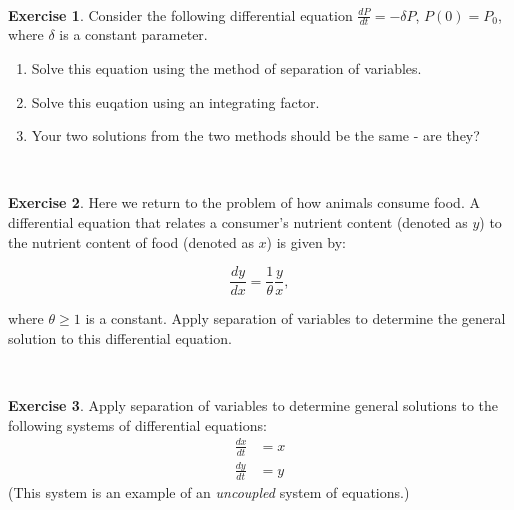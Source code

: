 \documentclass[
]{book}
\theoremstyle{definition}
\theoremstyle{definition}
\theoremstyle{definition}
\newtheorem{exercise}{Exercise}[chapter]
\theoremstyle{remark}
\begin{document}
~

\begin{exercise}
\protect\hypertarget{exr:unnamed-chunk-123}{}{\label{exr:unnamed-chunk-123} }Consider the following differential equation \(\displaystyle \frac{dP}{dt} = - \delta P\), \(P(0)=P_{0}\), where \(\delta\) is a constant parameter.

\begin{enumerate}[label=\alph*.]
\item Solve this equation using the method of separation of variables.
\item Solve this euqation using an integrating factor.
\item Your two solutions from the two methods should be the same - are they?
\end{enumerate}
\end{exercise}

~

\begin{exercise}
\protect\hypertarget{exr:unnamed-chunk-124}{}{\label{exr:unnamed-chunk-124} }Here we return to the problem of how animals consume food. A differential equation that relates a consumer's nutrient content (denoted as \(y\)) to the nutrient content of food (denoted as \(x\)) is given by:

\begin{equation}
\frac{dy}{dx} = \frac{1}{\theta} \frac{y}{x},
\end{equation}

where \(\theta \geq 1\) is a constant. Apply separation of variables to determine the general solution to this differential equation.
\end{exercise}

~

\begin{exercise}
\protect\hypertarget{exr:unnamed-chunk-125}{}{\label{exr:unnamed-chunk-125} }Apply separation of variables to determine general solutions to the following systems of differential equations:
\begin{equation}
\begin{split} 
\frac{dx}{dt} &= x \\ 
\frac{dy}{dt} &= y
\end{split}
\end{equation}
(This system is an example of an \emph{uncoupled} system of equations.)
\end{exercise}

~
\end{document}
